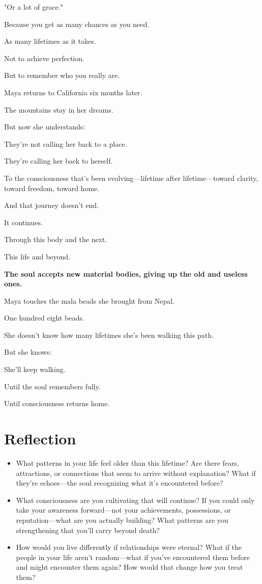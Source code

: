 \documentclass[11pt,twoside]{book}
\begin{document}
"Or a lot of grace."

Because you get as many chances as you need.

As many lifetimes as it takes.

Not to achieve perfection.

But to remember who you really are.

Maya returns to California six months later.

The mountains stay in her dreams.

But now she understands:

They're not calling her back to a place.

They're calling her back to herself.

To the consciousness that's been evolving—lifetime after lifetime—toward clarity, toward freedom, toward home.

And that journey doesn't end.

It continues.

Through this body and the next.

This life and beyond.

\textbf{The soul accepts new material bodies, giving up the old and useless ones.}

Maya touches the mala beads she brought from Nepal.

One hundred eight beads.

She doesn't know how many lifetimes she's been walking this path.

But she knows:

She'll keep walking.

Until the soul remembers fully.

Until consciousness returns home.

\section*{Reflection}

\begin{itemize}
\item What patterns in your life feel older than this lifetime? Are there fears, attractions, or connections that seem to arrive without explanation? What if they're echoes—the soul recognizing what it's encountered before?
\item What consciousness are you cultivating that will continue? If you could only take your awareness forward—not your achievements, possessions, or reputation—what are you actually building? What patterns are you strengthening that you'll carry beyond death?
\item How would you live differently if relationships were eternal? What if the people in your life aren't random—what if you've encountered them before and might encounter them again? How would that change how you treat them?
\end{itemize}
\end{document}
